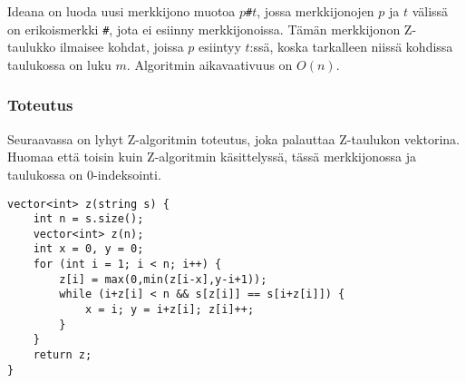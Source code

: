 \noindent
Ideana on luoda uusi merkkijono muotoa $p$\texttt{\#}$t$,
jossa merkkijonojen $p$ ja $t$ välissä on
erikoismerkki \texttt{\#},
jota ei esiinny merkkijonoissa.
Tämän merkkijonon Z-taulukko ilmaisee kohdat,
joissa $p$ esiintyy $t$:ssä,
koska tarkalleen niissä kohdissa taulukossa on luku $m$.
Algoritmin aikavaativuus on $O(n)$.

\subsubsection{Toteutus}

Seuraavassa on lyhyt Z-algoritmin toteutus,
joka palauttaa Z-taulukon vektorina.
Huomaa että toisin kuin Z-algoritmin käsittelyssä,
tässä merkkijonossa ja taulukossa on 0-indeksointi.

\begin{lstlisting}
vector<int> z(string s) {
    int n = s.size();
    vector<int> z(n);
    int x = 0, y = 0;
    for (int i = 1; i < n; i++) {
        z[i] = max(0,min(z[i-x],y-i+1));
        while (i+z[i] < n && s[z[i]] == s[i+z[i]]) {
            x = i; y = i+z[i]; z[i]++;
        }
    }
    return z;
}
\end{lstlisting}


